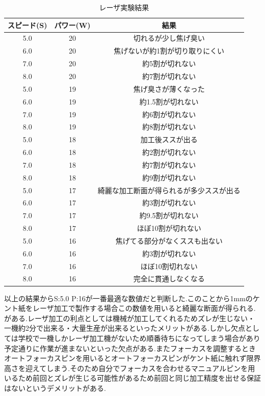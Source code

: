 \begin{table}[H]
 \begin{center}
   \caption{レーザ実験結果}
   \begin{tabular}[htbp]{|c|c|c|}
    \hline
    スピード(S)&パワー(W)&結果 \\
    \hline
    5.0&20&切れるが少し焦げ臭い\\
    \hline
    6.0&20&焦げないが約1割が切り取りにくい\\
    \hline
    7.0&20&約5割が切れない\\
    \hline
    8.0&20&約7割が切れない\\
    \hline
    5.0&19&焦げ臭さが薄くなった\\
    \hline
    6.0&19&約1.5割が切れない\\
    \hline
    7.0&19&約6割が切れない\\
    \hline
    8.0&19&約8割が切れない\\
    \hline
    5.0&18&加工後ススが出る\\
    \hline
    6.0&18&約2割が切れない\\
    \hline
    7.0&18&約7割が切れない\\
    \hline
    8.0&18&約9割が切れない\\
    \hline
    5.0&17&綺麗な加工断面が得られるが多少ススが出る\\
    \hline
    6.0&17&約3割が切れない\\
    \hline
    7.0&17&約9.5割が切れない\\
    \hline
    8.0&17&ほぼ10割が切れない\\
    \hline
    5.0&16&焦げてる部分がなくススも出ない\\
    \hline
    6.0&16&約3割が切れない\\
    \hline
    7.0&16&ほぼ10割切れない\\
    \hline
    8.0&16&完全に貫通しなくなる\\
    \hline
   \end{tabular}
   \label{tab:experiment}
  \end{center}
\end{table}


以上の結果からS:5.0 P:16が一番最適な数値だと判断した.このことから1mmのケント紙をレーザ加工で製作する場合この数値を用いると綺麗な断面が得られる.がある.レーザ加工の利点としては機械が加工してくれるためズレが生じない・一機約2分で出来る・大量生産が出来るといったメリットがある.しかし欠点としては学校で一機しかレーザ加工機がないため順番待ちになってしまう場合があり予定通りに作業が進まないといった欠点がある.またフォーカスを調整するときオートフォーカスピンを用いるとオートフォーカスピンがケント紙に触れず限界高さを迎えてしまう.そのため自分でフォーカスを合わせるマニュアルピンを用いるため前回とズレが生じる可能性があるため前回と同じ加工精度を出せる保証はないというデメリットがある.

